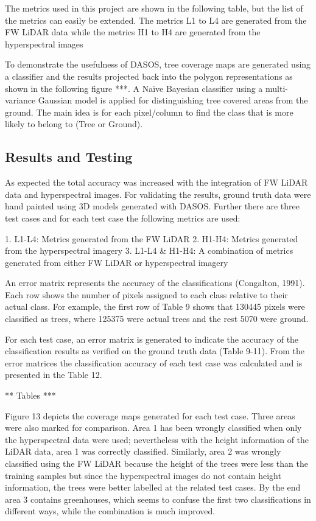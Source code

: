 \documentclass{subfiles}
\begin{document}
\par The metrics used in this project are shown in the following table, but the list of the metrics can easily be extended. The metrics L1 to L4 are generated from the FW LiDAR data while the metrics H1 to H4 are generated from the hyperspectral images

\par To demonstrate the usefulness of DASOS, tree coverage maps are generated using a classifier and the results projected back into the polygon representations as shown in the following figure ***. A Naïve Bayesian classifier using a multi-variance Gaussian model is applied for distinguishing tree covered areas from the ground. The main idea is for each pixel/column to find the class
that is more likely to belong to (Tree or Ground).

\subsection{Results and Testing}
\par As expected the total accuracy was increased with the integration of FW LiDAR data and hyperspectral images. For validating the results, ground truth data were hand painted using 3D models generated with DASOS. Further there are three test cases and for each test case the following metrics are used:

1. L1-L4: Metrics generated from the FW LiDAR
2. H1-H4: Metrics generated from the hyperspectral
imagery
3. L1-L4 \& H1-H4: A combination of metrics generated from either FW LiDAR or hyperspectral imagery 

\par An error matrix represents the accuracy of the classifications (Congalton, 1991). Each row shows the number of pixels assigned to each class relative to their actual class. For example, the first row of Table 9 shows that 130445 pixels were classified as trees, where 125375 were actual trees and the rest 5070 were ground.

\par For each test case, an error matrix is generated to indicate the accuracy of the classification results as verified on the ground truth data (Table 9-11). From the error matrices the classification accuracy of each test case was calculated and is
presented in the Table 12.


** Tables ***

\par Figure 13 depicts the coverage maps generated for each test case. Three areas were also marked for comparison. Area 1 has been wrongly classified when only the hyperspectral data were used; nevertheless with the height information of the LiDAR
data, area 1 was correctly classified. Similarly, area 2 was wrongly classified using the FW LiDAR because the height of the trees were less than the training samples but since the hyperspectral images do not contain height information, the
trees were better labelled at the related test cases. By the end area 3 contains greenhouses, which seems to confuse the first two classifications in different ways, while the combination is much improved. 
\end{document}

